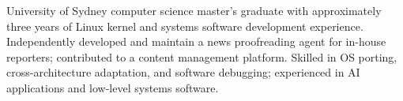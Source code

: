 

\begin{cvparagraph}

University of Sydney computer science master's graduate with approximately three years of Linux kernel and systems software development experience. Independently developed and maintain a news proofreading agent for in-house reporters; contributed to a content management platform. Skilled in OS porting, cross-architecture adaptation, and software debugging; experienced in AI applications and low-level systems software.

\end{cvparagraph}
